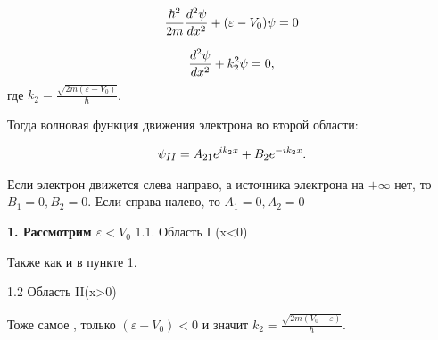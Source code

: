 \documentclass[__main__.tex]{subfiles}
\begin{document}
\begin{gather}
\llabel{movi5}
\frac{\hbar^{2}}{2m}\frac{d^{2}\psi}{dx^{2}}+(\varepsilon-V_{0})\psi=0
\end{gather}

\begin{gather}
\llabel{movi6}
\frac{d^{2}\psi}{dx^{2}}+k_{2}^{2}\psi=0,
\end{gather}
где $k_{2}=\frac{\sqrt{2m(\varepsilon-V_{0})}}{\hbar}$.

Тогда волновая функция движения электрона во второй  области:

\begin{gather}
\llabel{movi7}
\psi_{II}=A_{21}e^{ik_{2}x}+B_{2}e^{-ik_{2}x}.
\end{gather}

Если электрон движется слева направо, а источника электрона на $+\infty$ нет, то $B_{1}=0, B_{2}=0$. Если справа налево, то  $A_{1}=0, A_{2}=0$

\textbf{1. Рассмотрим  $\varepsilon<V_{0}$ }
1.1. Область I (x<0)

Также как и в пункте 1.


1.2 Область II(x>0)

Тоже самое , только $(\varepsilon-V_{0})<0$ и значит  $k_{2}=\frac{\sqrt{2m(V_{0}-\varepsilon)}}{\hbar}$.
\end{document}
